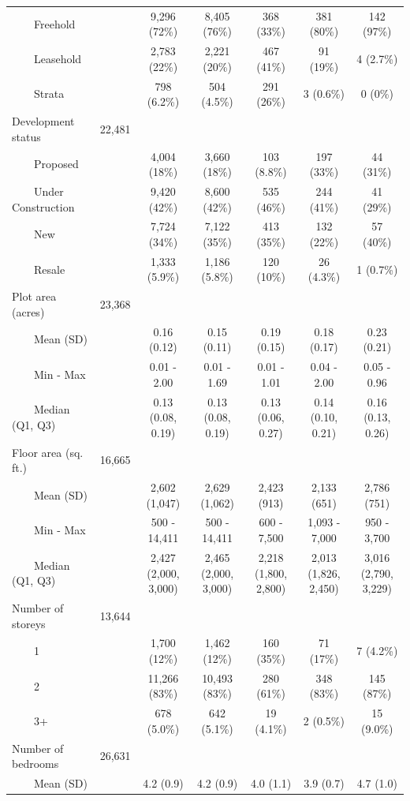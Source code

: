 \documentclass[
  number]{elsarticle}
\begin{document}
\begin{landscape}
\begin{table}
{\begin{tabular*}{\linewidth}{@{\extracolsep{\fill}}lcccccc}
    Freehold &  & 9,296 (72\%) & 8,405 (76\%) & 368 (33\%) & 381 (80\%) & 142 (97\%) \\ 
    Leasehold &  & 2,783 (22\%) & 2,221 (20\%) & 467 (41\%) & 91 (19\%) & 4 (2.7\%) \\ 
    Strata &  & 798 (6.2\%) & 504 (4.5\%) & 291 (26\%) & 3 (0.6\%) & 0 (0\%) \\ 
Development status & 22,481 &  &  &  &  &  \\ 
    Proposed &  & 4,004 (18\%) & 3,660 (18\%) & 103 (8.8\%) & 197 (33\%) & 44 (31\%) \\ 
    Under Construction &  & 9,420 (42\%) & 8,600 (42\%) & 535 (46\%) & 244 (41\%) & 41 (29\%) \\ 
    New &  & 7,724 (34\%) & 7,122 (35\%) & 413 (35\%) & 132 (22\%) & 57 (40\%) \\ 
    Resale &  & 1,333 (5.9\%) & 1,186 (5.8\%) & 120 (10\%) & 26 (4.3\%) & 1 (0.7\%) \\ 
Plot area (acres) & 23,368 &  &  &  &  &  \\ 
    Mean (SD) &  & 0.16 (0.12) & 0.15 (0.11) & 0.19 (0.15) & 0.18 (0.17) & 0.23 (0.21) \\ 
    Min - Max &  & 0.01 - 2.00 & 0.01 - 1.69 & 0.01 - 1.01 & 0.04 - 2.00 & 0.05 - 0.96 \\ 
    Median (Q1, Q3) &  & 0.13 (0.08, 0.19) & 0.13 (0.08, 0.19) & 0.13 (0.06, 0.27) & 0.14 (0.10, 0.21) & 0.16 (0.13, 0.26) \\ 
Floor area (sq. ft.) & 16,665 &  &  &  &  &  \\ 
    Mean (SD) &  & 2,602 (1,047) & 2,629 (1,062) & 2,423 (913) & 2,133 (651) & 2,786 (751) \\ 
    Min - Max &  & 500 - 14,411 & 500 - 14,411 & 600 - 7,500 & 1,093 - 7,000 & 950 - 3,700 \\ 
    Median (Q1, Q3) &  & 2,427 (2,000, 3,000) & 2,465 (2,000, 3,000) & 2,218 (1,800, 2,800) & 2,013 (1,826, 2,450) & 3,016 (2,790, 3,229) \\ 
Number of storeys & 13,644 &  &  &  &  &  \\ 
    1 &  & 1,700 (12\%) & 1,462 (12\%) & 160 (35\%) & 71 (17\%) & 7 (4.2\%) \\ 
    2 &  & 11,266 (83\%) & 10,493 (83\%) & 280 (61\%) & 348 (83\%) & 145 (87\%) \\ 
    3+ &  & 678 (5.0\%) & 642 (5.1\%) & 19 (4.1\%) & 2 (0.5\%) & 15 (9.0\%) \\ 
Number of bedrooms & 26,631 &  &  &  &  &  \\ 
    Mean (SD) &  & 4.2 (0.9) & 4.2 (0.9) & 4.0 (1.1) & 3.9 (0.7) & 4.7 (1.0) \\ 

\end{tabular*}}
\end{table}
\end{landscape}
\end{document}
